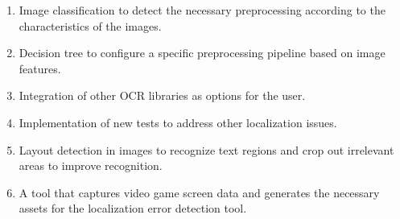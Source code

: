 \begin{enumerate}
	\item Image classification to detect the necessary preprocessing according to the characteristics of the images.
	\item Decision tree to configure a specific preprocessing pipeline based on image features.
	\item Integration of other OCR libraries as options for the user.
	\item Implementation of new tests to address other localization issues.
	\item Layout detection in images to recognize text regions and crop out irrelevant areas to improve recognition.
	\item A tool that captures video game screen data and generates the necessary assets for the localization error detection tool.
\end{enumerate}
